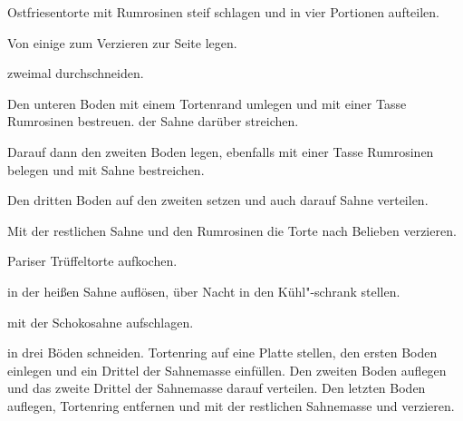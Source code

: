 \begin{recipe}{Ostfriesentorte mit Rumrosinen}
  steif schlagen und in vier Portionen aufteilen.

  Von
  einige zum Verzieren zur Seite legen.

  zweimal durchschneiden.

  Den unteren Boden mit einem Tortenrand umlegen und mit einer Tasse
  Rumrosinen bestreuen.  der Sahne darüber streichen.

  Darauf dann den zweiten Boden legen, ebenfalls mit einer
  Tasse Rumrosinen belegen und mit  Sahne bestreichen.

  Den dritten Boden auf den zweiten setzen und auch darauf 
  Sahne verteilen.

  Mit der restlichen Sahne und den Rumrosinen die Torte nach Belieben verzieren. 
\end{recipe}


\begin{recipe}{Pariser Trüffeltorte}
  aufkochen.
  
  in der heißen Sahne auflösen, über Nacht in den Kühl"-schrank stellen.

  mit der Schokosahne aufschlagen.

  in drei Böden schneiden. Tortenring auf eine Platte stellen, den
  ersten Boden einlegen und ein Drittel der Sahnemasse einfüllen. Den
  zweiten Boden auflegen und das zweite Drittel der Sahnemasse darauf
  verteilen. Den letzten Boden auflegen, Tortenring entfernen und mit
  der restlichen Sahnemasse und
  verzieren.
\end{recipe}
